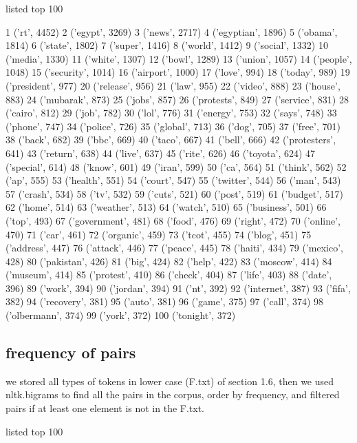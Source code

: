 \documentclass{article}
\begin{document}
listed top 100

\begin{spverbatim}
1 ('rt', 4452)
2 ('egypt', 3269)
3 ('news', 2717)
4 ('egyptian', 1896)
5 ('obama', 1814)
6 ('state', 1802)
7 ('super', 1416)
8 ('world', 1412)
9 ('social', 1332)
10 ('media', 1330)
11 ('white', 1307)
12 ('bowl', 1289)
13 ('union', 1057)
14 ('people', 1048)
15 ('security', 1014)
16 ('airport', 1000)
17 ('love', 994)
18 ('today', 989)
19 ('president', 977)
20 ('release', 956)
21 ('law', 955)
22 ('video', 888)
23 ('house', 883)
24 ('mubarak', 873)
25 ('jobs', 857)
26 ('protests', 849)
27 ('service', 831)
28 ('cairo', 812)
29 ('job', 782)
30 ('lol', 776)
31 ('energy', 753)
32 ('says', 748)
33 ('phone', 747)
34 ('police', 726)
35 ('global', 713)
36 ('dog', 705)
37 ('free', 701)
38 ('back', 682)
39 ('bbc', 669)
40 ('taco', 667)
41 ('bell', 666)
42 ('protesters', 641)
43 ('return', 638)
44 ('live', 637)
45 ('rite', 626)
46 ('toyota', 624)
47 ('special', 614)
48 ('know', 601)
49 ('iran', 599)
50 ('ca', 564)
51 ('think', 562)
52 ('ap', 555)
53 ('health', 551)
54 ('court', 547)
55 ('twitter', 544)
56 ('man', 543)
57 ('crash', 534)
58 ('tv', 532)
59 ('cuts', 521)
60 ('post', 519)
61 ('budget', 517)
62 ('home', 514)
63 ('weather', 513)
64 ('watch', 510)
65 ('business', 501)
66 ('top', 493)
67 ('government', 481)
68 ('food', 476)
69 ('right', 472)
70 ('online', 470)
71 ('car', 461)
72 ('organic', 459)
73 ('tcot', 455)
74 ('blog', 451)
75 ('address', 447)
76 ('attack', 446)
77 ('peace', 445)
78 ('haiti', 434)
79 ('mexico', 428)
80 ('pakistan', 426)
81 ('big', 424)
82 ('help', 422)
83 ('moscow', 414)
84 ('museum', 414)
85 ('protest', 410)
86 ('check', 404)
87 ('life', 403)
88 ('date', 396)
89 ('work', 394)
90 ('jordan', 394)
91 ('nt', 392)
92 ('internet', 387)
93 ('fifa', 382)
94 ('recovery', 381)
95 ('auto', 381)
96 ('game', 375)
97 ('call', 374)
98 ('olbermann', 374)
99 ('york', 372)
100 ('tonight', 372)	
\end{spverbatim}

\subsection{frequency of pairs}
we stored all types of tokens in lower case (F.txt) of section 1.6, then we used nltk.bigrams to find all the pairs in the corpus, order by frequency, and filtered pairs if at least one element is not in the F.txt. \newline

listed top 100
\end{document}
